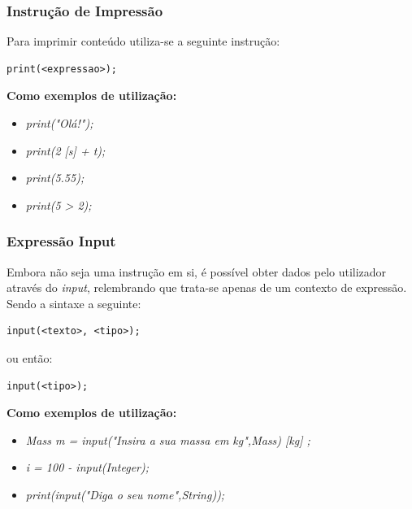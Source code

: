 \documentclass[10pt,portuguese]{article}
\begin{document}
\subsubsection{Instrução de Impressão}
\par Para imprimir conteúdo utiliza-se a seguinte instrução:
\begin{lstlisting}[numbers=none]
print(<expressao>);
\end{lstlisting}
\newline
\par \textbf{Como exemplos de utilização:}
\begin{itemize}
    \item \textit{print("Olá!");}
    \item \textit{print(2 [s] + t);}
    \item \textit{print(5.55);}
    \item \textit{print(5 > 2);}
\end{itemize}

\subsubsection{Expressão Input}
\par Embora não seja uma instrução em si, é possível obter dados pelo utilizador através do \emph{input}, relembrando que trata-se apenas de um contexto de expressão. Sendo a sintaxe a seguinte:
\begin{lstlisting}[numbers=none]
input(<texto>, <tipo>);
\end{lstlisting}
\par ou então:
\begin{lstlisting}[numbers=none]
input(<tipo>);
\end{lstlisting}
\newline
\par \textbf{Como exemplos de utilização:}
\begin{itemize}
    \item \textit{Mass m = input("Insira a sua massa em kg",Mass) [kg] ;}
    \item \textit{i = 100 - input(Integer);}
    \item \textit{print(input("Diga o seu nome",String));}
\end{itemize}
\end{document}
